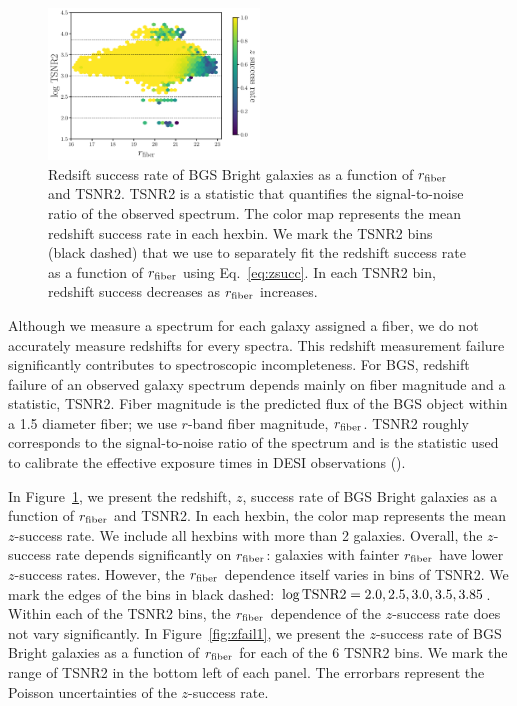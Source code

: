 \begin{figure}[h]
\begin{center}
    \includegraphics[width=0.5\textwidth]{figs/bgs_bright_rfib_tsnr2.pdf} 
    \caption{
        Redsift success rate of BGS Bright galaxies as a function of 
        $r_{\rm fiber}$ and TSNR2.
        TSNR2 is a statistic that quantifies the signal-to-noise ratio of the
        observed spectrum. 
        The color map represents the mean redshift success rate in each hexbin.
        We mark the TSNR2 bins (black dashed) that we use to separately fit the
        redshift success rate as a function of $r_{\rm fiber}$ using
        Eq.~\ref{eq:zsucc}.
        In each TSNR2 bin, redshift success decreases as $r_{\rm fiber}$
        increases. 
    }\label{fig:zfail0}
\end{center}
\end{figure}

Although we measure a spectrum for each galaxy assigned a fiber, we do not
accurately measure redshifts for every spectra. 
This redshift measurement failure significantly contributes to spectroscopic
incompleteness. 
For BGS, redshift failure of an observed galaxy spectrum depends mainly on
fiber magnitude and a statistic, TSNR2.
Fiber magnitude is the predicted flux of the BGS object within a 1.5\arcsec
diameter fiber; we use $r$-band fiber magnitude, $r_{\rm fiber}$.  
TSNR2 roughly corresponds to the signal-to-noise ratio of the spectrum and is 
the statistic used to calibrate the effective exposure times in DESI
observations ().

In Figure~\ref{fig:zfail0}, we present the redshift, $z$, success rate of BGS
Bright galaxies as a function of $r_{\rm fiber}$ and TSNR2.
In each hexbin, the color map represents the mean $z$-success rate. 
We include all hexbins with more than 2 galaxies. 
Overall, the $z$-success rate depends significantly on $r_{\rm fiber}$:
galaxies with fainter $r_{\rm fiber}$ have lower $z$-success rates. 
However, the $r_{\rm fiber}$ dependence itself varies in bins of TSNR2. 
We mark the edges of the bins in black dashed: $\log {\rm TSNR2} = 2.0, 2.5,
3.0, 3.5, 3.85$.
Within each of the TSNR2 bins, the $r_{\rm fiber}$ dependence of the
$z$-success rate does not vary significantly. 
In Figure~\ref{fig:zfail1}, we present the $z$-success rate of BGS Bright
galaxies as a function of $r_{\rm fiber}$ for each of the 6 TSNR2 bins.
We mark the range of TSNR2 in the bottom left of each panel. 
The errorbars represent the Poisson uncertainties of the $z$-success rate.

